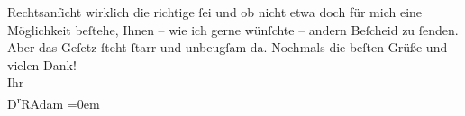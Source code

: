 \begin{ledgroupsized}[t]{13cm}
                    Rechtsanſicht wirklich die richtige ſei und ob nicht etwa doch für mich eine
                    Möglichkeit beſtehe, Ihnen – wie ich gerne wünſchte – andern Beſcheid zu ſenden.
                    Aber {\pb}das Geſetz ſteht ſtarr und
                    unbeugſam da.\pend
           \pstart
           Nochmals die beſten Grüße und vielen Dank!{\\[\baselineskip]}Ihr{\\[\baselineskip]}\spacefill\mbox{D\textsuperscript{r}RAdam}\pend
           \leftskip=0em{}          \endnumbering{}\end{ledgroupsized}  \newcommand{\dateiname}{L02357}\newcommand{\titel}{Robert Adam an Arthur Schnitzler, 1. – 3. 11. 1920}\newcommand{\editorInnen}{Martin Anton Müller und Gerd-Hermann Susen}
            \footnotesize
\begin{ledgroupsized}[t]{11.5cm}
\end{ledgroupsized}
         
      